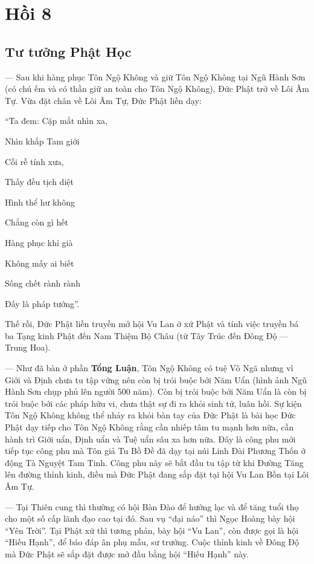 \chapter{Hồi 8} %
\label{cha:hoi_8}

\section{Tư tưởng Phật Học} %
\label{sec:8_phat_hoc}

— Sau khi hàng phục Tôn Ngộ Không và giữ Tôn Ngộ Không tại Ngũ Hành Sơn (có chú ếm và có thần giữ an toàn cho Tôn Ngộ Không), Đức Phật trở về Lôi Âm Tự. Vừa đặt chân về Lôi Âm Tự, Đức Phật liền dạy:

\begin{itshape}
``Ta đem: Cặp mắt nhìn xa,

Nhìn khắp Tam giới

Cỗi rễ tính xưa,

Thấy đều tịch diệt

Hình thể hư không

Chẳng còn gì hết

Hàng phục khỉ già

Không mấy ai biết

Sống chết rành rành

Đấy là pháp tướng''.
\end{itshape}

Thế rồi, Đức Phật liền truyền mở hội Vu Lan ở xứ Phật và tính việc truyền bá ba Tạng kinh Phật đến Nam Thiệm Bộ Châu (từ Tây Trúc đến Đông Độ — Trung Hoa).

— Như đã bàn ở phần {\bf Tổng Luận}, Tôn Ngộ Không có tuệ Vô Ngã nhưng vì Giới và Định chưa tu tập vững nên còn bị trói buộc bởi Năm Uẩn (hình ảnh Ngũ Hành Sơn chụp phủ lên người 500 năm). Còn bị trói buộc bởi Năm Uẩn là còn bị trói buộc bởi các pháp hữu vi, chưa thật sự đi ra khỏi sinh tử, luân hồi. Sự kiện Tôn Ngộ Không không thể nhảy ra khỏi bàn tay của Đức Phật là bài học Đức Phật dạy tiếp cho Tôn Ngộ Không rằng cần nhiếp tâm tu mạnh hơn nữa, cần hành trì Giới uẩn, Định uẩn và Tuệ uẩn sâu xa hơn nữa. Đây là công phu mới tiếp tục công phu mà Tôn giả Tu Bồ Đề đã dạy tại núi Linh Đài Phương Thốn ở động Tà Nguyệt Tam Tinh. Công phu này sẽ bắt đầu tu tập từ khi Đường Tăng lên đường thỉnh kinh, điều mà Đức Phật đang sắp đặt tại hội Vu Lan Bồn tại Lôi Âm Tự.

— Tại Thiên cung thì thường có hội Bàn Đào để hưởng lạc và để tăng tuổi thọ cho một số cấp lãnh đạo cao tại đó. Sau vụ ``đại náo'' thì Ngọc Hoàng bày hội ``Yên Trời''. Tại Phật xứ thì tương phản, bày hội ``Vu Lan'', còn được gọi là hội ``Hiếu Hạnh'', để báo đáp ân phụ mẫu, sư trưởng. Cuộc thỉnh kinh về Đông Độ mà Đức Phật sẽ sắp đặt được mở đầu bằng hội ``Hiếu Hạnh'' này.

